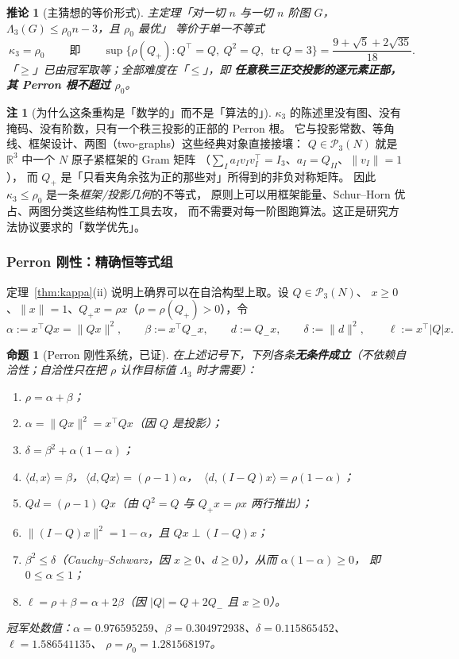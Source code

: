 \documentclass[UTF8,11pt]{ctexart}
\newtheorem{proposition}[theorem]{命题}
\newtheorem{corollary}[theorem]{推论}
\theoremstyle{definition}
\newtheorem{remark}[theorem]{注}
\newcommand{\Lam}{\Lambda}
\newcommand{\tr}{\operatorname{tr}}
\newcommand{\R}{\mathbb{R}}
\begin{document}
\begin{corollary}[主猜想的等价形式]\label{cor:kappamain}
主定理「对一切 $n$ 与一切 $n$ 阶图 $G$，$\Lam_3(G)\le\rho_0n-3$，且 $\rho_0$ 最优」
等价于单一不等式
\[
\boxed{\ \kappa_3=\rho_0\ }\qquad\text{即}\qquad
\sup\{\rho(Q_+):Q^\top=Q,\ Q^2=Q,\ \tr Q=3\}=\frac{9+\sqrt5+2\sqrt{35}}{18}.
\]
「$\ge$」已由冠军取等；全部难度在「$\le$」，即
\textbf{任意秩三正交投影的逐元素正部，其 Perron 根不超过 $\rho_0$}。
\end{corollary}

\begin{remark}[为什么这条重构是「数学的」而不是「算法的」]
$\kappa_3$ 的陈述里没有图、没有掩码、没有阶数，只有一个秩三投影的正部的 Perron 根。
它与投影常数、等角线、框架设计、两图（two-graphs）这些经典对象直接接壤：
$Q\in\mathcal P_3(N)$ 就是 $\R^3$ 中一个 $N$ 原子紧框架的 Gram 矩阵
（$\sum_Ia_Iv_Iv_I^\top=I_3$、$a_I=Q_{II}$、$\|v_I\|=1$），
而 $Q_+$ 是「只看夹角余弦为正的那些对」所得到的非负对称矩阵。
因此 $\kappa_3\le\rho_0$ 是一条\emph{框架/投影几何}的不等式，
原则上可以用框架能量、Schur--Horn 优占、两图分类这些结构性工具去攻，
而不需要对每一阶图跑算法。这正是研究方法协议要求的「数学优先」。
\end{remark}

\subsubsection{Perron 刚性：精确恒等式组}\label{sec:perronrig}

定理~\ref{thm:kappa}(ii) 说明上确界可以在自洽构型上取。设 $Q\in\mathcal P_3(N)$、
$x\ge0$、$\|x\|=1$、$Q_+x=\rho x$（$\rho=\rho(Q_+)>0$），令
\[
\alpha:=x^\top Qx=\|Qx\|^2,\qquad \beta:=x^\top Q_-x,\qquad d:=Q_-x,\qquad
\delta:=\|d\|^2,\qquad \ell:=x^\top|Q|x .
\]

\begin{proposition}[Perron 刚性系统，已证]\label{prop:perronrig}
在上述记号下，下列各条\textbf{无条件成立}（不依赖自洽性；自洽性只在把 $\rho$ 认作目标值 $\Lam_3$ 时才需要）：
\begin{enumerate}[label=(\alph*),leftmargin=2.2em]
\item $\rho=\alpha+\beta$；
\item $\alpha=\|Qx\|^2=x^\top Qx$（因 $Q$ 是投影）；
\item $\delta=\beta^2+\alpha(1-\alpha)$；
\item $\langle d,x\rangle=\beta$，$\ \langle d,Qx\rangle=(\rho-1)\alpha$，
$\ \langle d,(I-Q)x\rangle=\rho(1-\alpha)$；
\item $Qd=(\rho-1)\,Qx$（由 $Q^2=Q$ 与 $Q_+x=\rho x$ 两行推出）；
\item $\|(I-Q)x\|^2=1-\alpha$，且 $Qx\perp(I-Q)x$；
\item $\beta^2\le\delta$（Cauchy--Schwarz，因 $x\ge0$、$d\ge0$），从而 $\alpha(1-\alpha)\ge0$，
即 $\boxed{0\le\alpha\le1}$；
\item $\ell=\rho+\beta=\alpha+2\beta$（因 $|Q|=Q+2Q_-$ 且 $x\ge0$）。
\end{enumerate}
冠军处数值：$\alpha=0.976595259$、$\beta=0.304972938$、$\delta=0.115865452$、$\ell=1.586541135$、
$\rho=\rho_0=1.281568197$。
\end{proposition}
\end{document}
